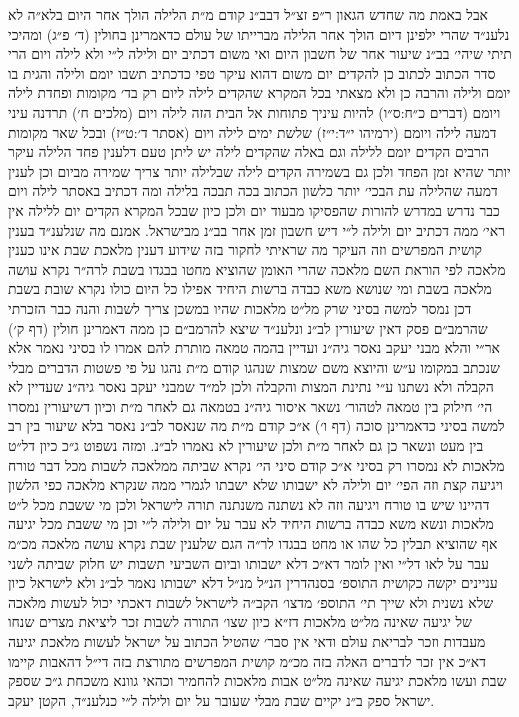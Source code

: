 \documentclass[12pt, openany]{book}
\begin{document}
\begin{multicols}{2}
אבל באמת מה שחדש הגאון ר״פ זצ״ל דבב״נ קודם מ״ת הלילה הולך אחר היום בלא״ה לא נלענ״ד שהרי ילפינן דיום הולך אחר הלילה מברייתו של עולם כדאמרינן בחולין (ד׳ פ״ג) ומהיכי תיתי שיהי׳ בב״נ שיעור אחר של חשבון היום ואי משום דכתיב יום ולילה ל״י ולא לילה ויום הרי סדר הכתוב לכתוב כן להקדים יום משום דהוא עיקר טפי כדכתיב תשבו יומם ולילה והגית בו יומם ולילה והרבה כן ולא מצאתי בכל המקרא שהקדים לילה ליום רק בד׳ מקומות ופחדת לילה ויומם (דברים כ״ח:ס״ו) להיות עיניך פתוחות אל הבית הזה לילה ויום (מלכים ח׳) תרדנה עיני דמעה לילה ויומם (ירמיהו י״ד:י״ז) שלשת ימים לילה ויום (אסתר ד׳:ט״ז) ובכל שאר מקומות הרבים הקדים יומם ללילה וגם באלה שהקדים לילה יש ליתן טעם דלענין פחד הלילה עיקר יותר שהיא זמן הפחד ולכן גם בשמירה הקדים לילה שבלילה יותר צריך שמירה מביום וכן לענין דמעה שהלילה עת הבכי׳ יותר כלשון הכתוב בכה תבכה בלילה ומה דכתיב באסתר לילה ויום כבר נדרש במדרש להורות שהפסיקו מבעוד יום ולכן כיון שבכל המקרא הקדים יום ללילה אין ראי׳ ממה דכתיב יום ולילה ל״י דיש חשבון זמן אחר בב״נ מבישראל. אמנם מה שנלענ״ד בענין קושית המפרשים וזה העיקר מה שראיתי לחקור בזה שידוע דענין מלאכת שבת אינו כענין מלאכה לפי הוראת השם מלאכה שהרי האומן שהוציא מחטו בבגדו בשבת לרה״ר נקרא עושה מלאכה בשבת ומי שנושא משא כבדה ברשות היחיד אפילו כל היום כולו נקרא שובת בשבת דכן נמסר למשה בסיני שרק מל״ט מלאכות שהיו במשכן צריך לשבות והנה כבר הזכרתי שהרמב״ם פסק דאין שיעורין לב״נ ונלענ״ד שיצא להרמב״ם כן ממה דאמרינן חולין (דף ק׳) אר״י והלא מבני יעקב נאסר גיה״נ ועדיין בהמה טמאה מותרת להם אמרו לו בסיני נאמר אלא שנכתב במקומו ע״ש והיוצא משם שמצות שנהגו קודם מ״ת נהגו על פי פשטות הדברים מבלי הקבלה ולא נשתנו ע״י נתינת המצות והקבלה ולכן למ״ד שמבני יעקב נאסר גיה״נ שעדיין לא הי׳ חילוק בין טמאה לטהור׳ נשאר איסור גיה״נ בטמאה גם לאחר מ״ת וכיון דשיעורין נמסרו למשה בסיני כדאמרינן סוכה (דף ו׳) א״כ קודם מ״ת מה שנאסר לב״נ נאסר בלא שיעור בין רב בין מעט ונשאר כן גם לאחר מ״ת ולכן שיעורין לא נאמרו לב״נ. ומזה נשפוט ג״כ כיון דל״ט מלאכות לא נמסרו רק בסיני א״כ קודם סיני הי׳ נקרא שביתה ממלאכה לשבות מכל דבר טורח ויגיעה קצת וזה הפי׳ יום ולילה לא ישבותו שלא ישבתו לגמרי ממה שנקרא מלאכה כפי הלשון דהיינו שיש בו טורח ויגיעה וזה לא נשתנה משנתנה תורה לישראל ולכן מי ששבת מכל ל״ט מלאכות ונשא משא כבדה ברשות היחיד לא עבר על יום ולילה ל״י וכן מי ששבת מכל יגיעה אף שהוציא תבלין כל שהו או מחט בבגדו לר״ה הגם שלענין שבת נקרא עושה מלאכה מכ״מ עבר על לאו דל״י ואין לומר דא״כ דלא ישבותו וביום השביעי תשבות יש חלוק שביתה לשני עניינים יקשה כקושית התוספ׳ בסנהדרין הנ״ל מנ״ל דלא ישבותו נאמר לב״נ ולא לישראל כיון שלא נשנית ולא שייך תי׳ התוספ׳ מדצו׳ הקב״ה לישראל לשבות דאכתי יכול לעשות מלאכה של יגיעה שאינה מל״ט מלאכות דז״א כיון שצו׳ התורה לשבות זכר ליציאת מצרים שנחו מעבדות וזכר לבריאת עולם ודאי אין סבר׳ שהטיל הכתוב על ישראל לעשות מלאכת יגיעה דא״כ אין זכר לדברים האלה בזה מכ״מ קושית המפרשים מתורצת בזה די״ל דהאבות קיימו שבת ועשו מלאכת יגיעה שאינה מל״ט אבות מלאכות להחמיר וכהאי גוונא משכחת ג״כ שספק ישראל ספק ב״נ יקיים שבת מבלי שעובר על יום ולילה ל״י כנלענ״ד, הקטן יעקב.\\\vspace{0pt}

\end{multicols}\newpage
\end{document}
